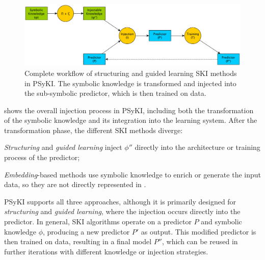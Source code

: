 \begin{figure}
    \centering
    \includegraphics[width=\textwidth]{figures/psyki-workflow}
    \caption[General workflow of PSyKI]{
        Complete workflow of structuring and guided learning \gls{SKI} methods in \Gls{PSyKI}.
        The symbolic knowledge is transformed and injected into the sub-symbolic predictor, which is then trained on data.
    }
    \label{fig:psyki-workflow}
\end{figure}
%
 shows the overall injection process in \gls{PSyKI}, including both the transformation of the symbolic knowledge and its integration into the learning system.
%
After the transformation phase, the different \gls{SKI} methods diverge:
%
\begin{inlinelist}
    \item \emph{Structuring} and \emph{guided learning} inject \(\phi''\) directly into the architecture or training process of the predictor;
    \item \emph{Embedding}-based methods use symbolic knowledge to enrich or generate the input data, so they are not directly represented in .
\end{inlinelist}

\Gls{PSyKI} supports all three approaches, although it is primarily designed for \emph{structuring} and \emph{guided learning}, where the injection occurs directly into the predictor.
%
In general, \gls{SKI} algorithms operate on a predictor \(P\) and symbolic knowledge \(\phi\), producing a new predictor \(P'\) as output.
%
This modified predictor is then trained on data, resulting in a final model \(P''\), which can be reused in further iterations with different knowledge or injection strategies.


